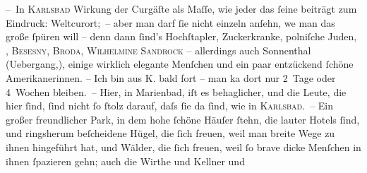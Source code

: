 \pstart
           – In \textsc{Karlsbad} Wirkung der Curgäſte als Maſſe, wie jeder das{ }ſeine beiträgt zum Eindruck:
               Weltcurort; – aber man darf{ }ſie nicht einzeln anſehn, we{\geminationn} man das große{ }ſpüren will – denn dann{ }ſind’s Hochſtapler, Zuckerkranke, polniſche Juden, \label{K_L00462-1v}\label{K_L00462-1}, \textsc{Besesny}, \textsc{Broda}, \textsc{Wilhelmine Sandrock} – allerdings auch Sonnenthal
               (Uebergang,), einige wirklich elegante Menſchen und ein paar entzückend{ }ſchöne
               Amerikanerinnen. – Ich bin aus \textsc{K}. {\pb}bald fort – man ka{\geminationn}
               dort nur 2 Tage oder 4 Wochen bleiben. – Hier, in Marienbad, iſt es behaglicher, und die Leute, die hier{ }ſind,{ }ſind nicht{ }ſo{ }ſtolz darauf, daſs{ }ſie da{ }ſind, wie in \textsc{Karlsbad}. – Ein großer freundlicher Park, in dem hohe{ }ſchöne Häuſer{ }ſtehn, die lauter
               Hotels{ }ſind, und ringsherum beſcheidene Hügel, die{ }ſich freuen, weil man breite Wege
               zu ihnen hingeführt hat, und Wälder, die{ }ſich freuen, weil{ }ſo brave dicke Menſchen in
               ihnen{ }ſpazieren gehn; auch die Wirthe und Kellner {\pb}und
